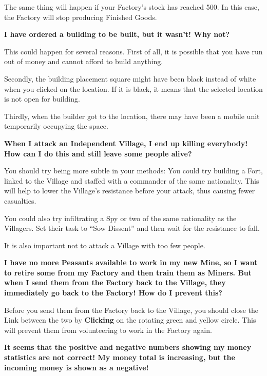 The same thing will happen if your Factory’s stock has reached 500. In this case, the Factory will stop producing Finished Goods.

{\large \textbf{\textsf{I have ordered a building to be built, but it wasn’t! Why not?}}}

This could happen for several reasons. First of all, it is possible that you have run out of money and cannot afford to build anything.

Secondly, the building placement square might have been black instead of white when you clicked on the location. If it is black, it means that the selected location is not open for building.


Thirdly, when the builder got to the location, there may have been a mobile unit temporarily occupying the space.

{\Large \textbf{\textsf{When I attack an Independent Village, I end up killing everybody! How can I do this and still leave some people alive?}}}

You should try being more subtle in your methods: You could try building a Fort, linked to the Village and staffed with a commander of the same nationality. This will help to lower the Village’s resistance before your attack, thus causing fewer casualties.


You could also try infiltrating a Spy or two of the same nationality as the Villagers. Set their task to “Sow Dissent” and then wait for the resistance to fall.

It is also important not to attack a Village with too few people.

{\large \textbf{\textsf{I have no more Peasants available to work in my new Mine, so I want to retire some from my Factory and then train them as Miners. But when I send them from the Factory back to the Village, they immediately go back to the Factory! How do I prevent this?}}}

Before you send them from the Factory back to the Village, you should close the Link between the two by \textbf{Clicking} on the rotating green and yellow circle. This will prevent them from volunteering to work in the Factory again.

{\large \textbf{\textsf{It seems that the positive and negative numbers showing my money statistics are not correct! My money total is increasing, but the incoming money is shown as a negative!}}}

